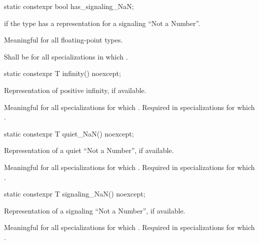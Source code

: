 %
\begin{itemdecl}
static constexpr bool has_signaling_NaN;
\end{itemdecl}

\begin{itemdescr}
\pnum
{} if the type has a representation for a signaling ``Not a Number''.

\pnum
Meaningful for all floating-point types.

\pnum
Shall be
for all specializations in which
.
\end{itemdescr}

%
\begin{itemdecl}
static constexpr T infinity() noexcept;
\end{itemdecl}

\begin{itemdescr}
\pnum
Representation of positive infinity, if available.

\pnum
Meaningful for all specializations for which
.
Required in specializations for which
.
\end{itemdescr}

%
\begin{itemdecl}
static constexpr T quiet_NaN() noexcept;
\end{itemdecl}

\begin{itemdescr}
\pnum
Representation of a quiet ``Not a Number'', if available.

\pnum
Meaningful for all specializations for which
.
Required in specializations for which
.
\end{itemdescr}

%
\begin{itemdecl}
static constexpr T signaling_NaN() noexcept;
\end{itemdecl}

\begin{itemdescr}
\pnum
Representation of a signaling ``Not a Number'', if available.

\pnum
Meaningful for all specializations for which
.
Required in specializations for which
.
\end{itemdescr}

